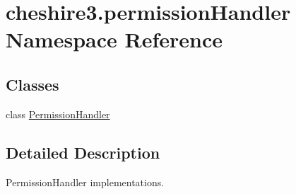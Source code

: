 \hypertarget{namespacecheshire3_1_1permission_handler}{\section{cheshire3.\-permission\-Handler Namespace Reference}
\label{namespacecheshire3_1_1permission_handler}
}
\subsection*{Classes}
\begin{DoxyCompactItemize}
\item 
class \hyperlink{classcheshire3_1_1permission_handler_1_1_permission_handler}{Permission\-Handler}
\end{DoxyCompactItemize}


\subsection{Detailed Description}
\begin{DoxyVerb}PermissionHandler implementations.\end{DoxyVerb}
 